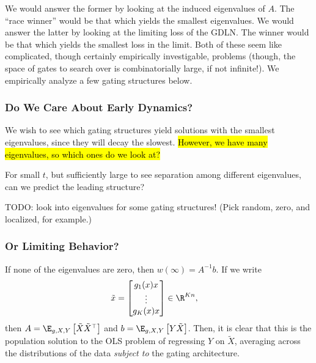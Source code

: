 \documentclass{article}
\begin{document}
We would answer the former by looking at the induced eigenvalues of $A$.
The ``race winner'' would be that which yields the smallest eigenvalues.
We would answer the latter by looking at the limiting loss of the GDLN.
The winner would be that which yields the smallest loss in the limit.
Both of these seem like complicated, though certainly empirically investigable, problems (though, the space of gates to search over is combinatorially large, if not infinite!).
We empirically analyze a few gating structures below.

\subsubsection{Do We Care About Early Dynamics?}
We wish to see which gating structures yield solutions with the smallest eigenvalues, since they will decay the slowest.
\hl{However, we have many eigenvalues, so which ones do we look at?}

For small $t$, but sufficiently large to see separation among different eigenvalues, can we predict the leading structure?

TODO: look into eigenvalues for some gating structures!
(Pick random, zero, and localized, for example.)

\subsubsection{Or Limiting Behavior?}
If none of the eigenvalues are zero, then $w(\infty) = A^{-1} b$.
If we write
\begin{align}
  \tilde{x} &= \begin{bmatrix} g_1(x) x \\ \vdots \\ g_K(x) x \end{bmatrix} \in \R^{Kn},
\end{align}
then $A = \E_{g,X,Y} \left[ \tilde{X} \tilde{X}^\top \right]$ and $b = \E_{g,X,Y} \left[ Y \tilde{X} \right]$.
Then, it is clear that this is the population solution to the OLS problem of regressing $Y$ on $\tilde{X}$, averaging across the distributions of the data \textit{subject to} the gating architecture.
\end{document}
